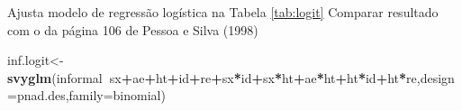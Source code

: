 \documentclass[]{book}
\newenvironment{Shaded}{\begin{snugshade}}{\end{snugshade}}
\newcommand{\KeywordTok}[1]{\textcolor[rgb]{0.13,0.29,0.53}{\textbf{#1}}}
\newcommand{\DataTypeTok}[1]{\textcolor[rgb]{0.13,0.29,0.53}{#1}}
\newcommand{\DecValTok}[1]{\textcolor[rgb]{0.00,0.00,0.81}{#1}}
\newcommand{\OtherTok}[1]{\textcolor[rgb]{0.56,0.35,0.01}{#1}}
\newcommand{\OperatorTok}[1]{\textcolor[rgb]{0.81,0.36,0.00}{\textbf{#1}}}
\newcommand{\NormalTok}[1]{#1}
\theoremstyle{definition}
\theoremstyle{definition}
\theoremstyle{definition}
\theoremstyle{remark}
\begin{document}
Ajusta modelo de regressão logística na Tabela \ref{tab:logit} Comparar
resultado com o da página 106 de Pessoa e Silva (1998)

\begin{Shaded}
\begin{Highlighting}[]
\NormalTok{inf.logit<-}\KeywordTok{svyglm}\NormalTok{(informal}\OperatorTok{~}\NormalTok{sx}\OperatorTok{+}\NormalTok{ae}\OperatorTok{+}\NormalTok{ht}\OperatorTok{+}\NormalTok{id}\OperatorTok{+}\NormalTok{re}\OperatorTok{+}\NormalTok{sx}\OperatorTok{*}\NormalTok{id}\OperatorTok{+}\NormalTok{sx}\OperatorTok{*}\NormalTok{ht}\OperatorTok{+}\NormalTok{ae}\OperatorTok{*}\NormalTok{ht}\OperatorTok{+}\NormalTok{ht}\OperatorTok{*}\NormalTok{id}\OperatorTok{+}\NormalTok{ht}\OperatorTok{*}\NormalTok{re,}\DataTypeTok{design=}\NormalTok{pnad.des,}\DataTypeTok{family=}\NormalTok{binomial)}
\end{Highlighting}
\end{Shaded}

\begin{Shaded}
\end{Shaded}
\end{document}
